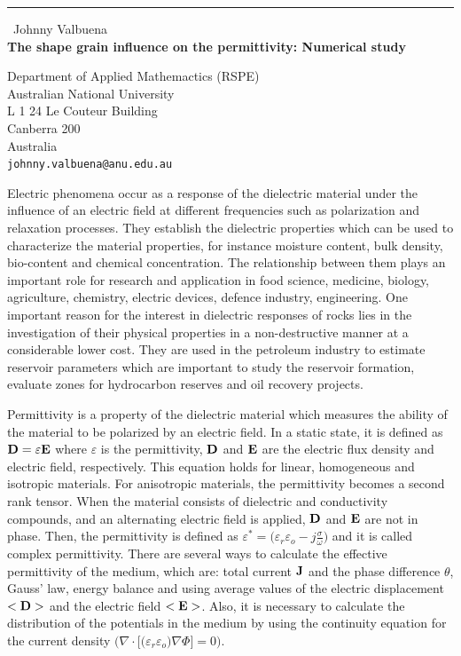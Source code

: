 \documentclass{report}
\begin{document}
\begin{center}
\rule{6in}{1pt} \
{\large Johnny Valbuena \\
{\bf The shape grain influence on the permittivity: Numerical study}}

Department of Applied Mathemactics (RSPE) \\ Australian National University \\ L 1 24 Le Couteur Building \\ Canberra 200 \\ Australia
\\
{\tt johnny.valbuena@anu.edu.au}\end{center}

Electric phenomena occur as a response of the dielectric material under
the influence of an electric field at different frequencies such as
polarization and relaxation processes. They establish the dielectric
properties which can be used to characterize the material properties, for
instance moisture content, bulk density, bio-content and chemical
concentration. The relationship between them plays an important role for
research and application in food science, medicine, biology, agriculture,
chemistry, electric devices, defence industry, engineering. One important
reason for the interest in dielectric responses of rocks lies in the
investigation of their physical properties in a non-destructive manner at
a considerable lower cost. They are used in the petroleum industry to
estimate reservoir parameters which are important to study the reservoir
formation, evaluate zones for hydrocarbon reserves and oil recovery
projects.

Permittivity is a property of the dielectric material which measures the
ability of the material to be polarized by an electric field. In a static
state, it is defined as ${\bf D} = \varepsilon {\bf E}$ where
$\varepsilon$ is the permittivity, ${\bf D}$ and ${\bf E}$ are the
electric flux density and electric field, respectively. This equation
holds for linear, homogeneous and isotropic materials. For anisotropic
materials, the permittivity becomes a second rank tensor. When the
material consists of dielectric and conductivity compounds, and an
alternating electric field is applied, ${\bf D}$ and ${\bf E}$ are not in
phase. Then, the permittivity is defined as $ \varepsilon^* = \big (
\varepsilon_r \varepsilon_o - j \frac{\sigma}{ \omega} \big )$ and it is
called complex permittivity. There are several ways to calculate the
effective permittivity of the medium, which are: total current ${\bf J}$
and the phase difference $\theta$, Gauss' law, energy balance and using
average values of the electric displacement $<{\bf D}>$ and the electric
field $<{\bf E}>$. Also, it is necessary to calculate the distribution of
the potentials in the medium by using the continuity equation for the
current density $\big ( \nabla \cdot \big [ \big ( \varepsilon_r
\varepsilon_o \big ) \nabla \Phi \big ] = 0 \big ) $.
\end{document}
